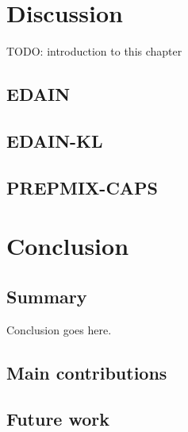 \documentclass{statsmsc}
\begin{document}
\chapter{Discussion} %

TODO: introduction to this chapter

\section{EDAIN}%
\label{sec:EDAIN-discuss}


\section{EDAIN-KL}%
\label{sec:EDAIN-KL-discuss}



\section{PREPMIX-CAPS}%
\label{sec:PREPMIX-CAPS}



\chapter{Conclusion} %

\section{Summary}%
\label{sec:Summary}



Conclusion goes here.




\section{Main contributions}%
\label{sec:Main contributions}



\section{Future work}%
\label{sec:Future work}
\end{document}
